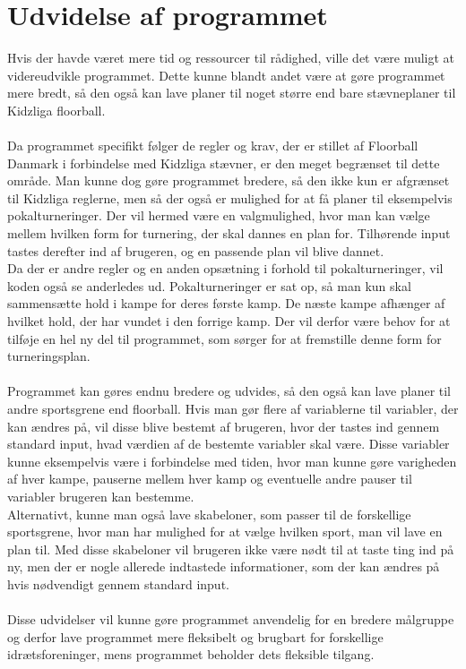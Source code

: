 \section*{Udvidelse af programmet}
Hvis der havde været mere tid og ressourcer til rådighed, ville det være muligt at videreudvikle programmet. Dette kunne blandt andet være at gøre programmet mere bredt, så den også kan lave planer til noget større end bare stævneplaner til Kidzliga floorball.
\\\\
Da programmet specifikt følger de regler og krav, der er stillet af Floorball Danmark i forbindelse med Kidzliga stævner, er den meget begrænset til dette område. Man kunne dog gøre programmet bredere, så den ikke kun er afgrænset til Kidzliga reglerne, men så der også er mulighed for at få planer til eksempelvis pokalturneringer. Der vil hermed være en valgmulighed, hvor man kan vælge mellem hvilken form for turnering, der skal dannes en plan for. Tilhørende input tastes derefter ind af brugeren, og en passende plan vil blive dannet.
\\
Da der er andre regler og en anden opsætning i forhold til pokalturneringer, vil koden også se anderledes ud. Pokalturneringer er sat op, så man kun skal sammensætte hold i kampe for deres første kamp. De næste kampe afhænger af hvilket hold, der har vundet i den forrige kamp. Der vil derfor være behov for at tilføje en hel ny del til programmet, som sørger for at fremstille denne form for turneringsplan. 
\\\\
Programmet kan gøres endnu bredere og udvides, så den også kan lave planer til andre sportsgrene end floorball. Hvis man gør flere af variablerne til variabler, der kan ændres på, vil disse blive bestemt af brugeren, hvor der tastes ind gennem standard input, hvad værdien af de bestemte variabler skal være. Disse variabler kunne eksempelvis være i forbindelse med tiden, hvor man kunne gøre varigheden af hver kampe, pauserne mellem hver kamp og eventuelle andre pauser til variabler brugeren kan bestemme.
\\
Alternativt, kunne man også lave skabeloner, som passer til de forskellige sportsgrene, hvor man har mulighed for at vælge hvilken sport, man vil lave en plan til. Med disse skabeloner vil brugeren ikke være nødt til at taste ting ind på ny, men der er nogle allerede indtastede informationer, som der kan ændres på hvis nødvendigt gennem standard input. 
\\\\
Disse udvidelser vil kunne gøre programmet anvendelig for en bredere målgruppe og derfor lave programmet mere fleksibelt og brugbart for forskellige idrætsforeninger, mens programmet beholder dets fleksible tilgang.

